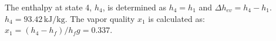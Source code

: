 The enthalpy at state 4, \( h_4 \), is determined as \( h_4 = h_1 \) and \( \Delta h_{ev} = h_4 - h_1 \).  
\( h_4 = 93.42 \, \text{kJ/kg} \).  
The vapor quality \( x_1 \) is calculated as:  
\( x_1 = (h_4 - h_f) / h_fg = 0.337 \).